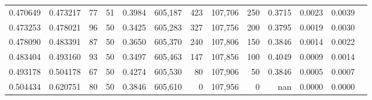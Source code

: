 \begin{tabular}{rrrrrrrrrrrrr}
0.470649 & 0.473217 &    77 &  51 &                                     0.3984 & 605,187 &     423 & 107,706 &     250 & 0.3715 & 0.0023 & 0.0039 \\
0.473253 & 0.478021 &    96 &  50 &                                     0.3425 & 605,283 &     327 & 107,756 &     200 & 0.3795 & 0.0019 & 0.0030 \\
0.478090 & 0.483391 &    87 &  50 &                                     0.3650 & 605,370 &     240 & 107,806 &     150 & 0.3846 & 0.0014 & 0.0022 \\
0.483404 & 0.493160 &    93 &  50 &                                     0.3497 & 605,463 &     147 & 107,856 &     100 & 0.4049 & 0.0009 & 0.0014 \\
0.493178 & 0.504178 &    67 &  50 &                                     0.4274 & 605,530 &      80 & 107,906 &      50 & 0.3846 & 0.0005 & 0.0007 \\
0.504434 & 0.620751 &    80 &  50 &                                     0.3846 & 605,610 &       0 & 107,956 &       0 &    nan & 0.0000 & 0.0000 \\
\bottomrule
\end{tabular}

